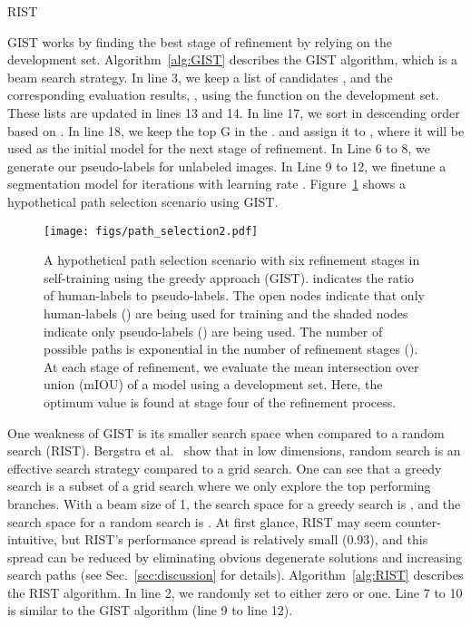 \documentclass[10pt, conference, compsocconf]{IEEEtran}
\begin{document}
\begin{algorithm}[h]
   \caption{RIST}
         \label{alg:RIST}
    \begin{algorithmic}[1]
    \scriptsize
    \FOR{ }
\STATE 
\STATE 
\STATE 
        \ENDFOR

            \STATE 
            \STATE 
        \ENDFOR
    \ENDFOR
\end{algorithmic}
\end{algorithm}


GIST works by finding the best stage of refinement by relying on the development set.
Algorithm~\ref{alg:GIST} describes the GIST algorithm, which is a beam search strategy. In line 3, we keep a list of candidates , and the corresponding evaluation results, , using the  function on the development set. These lists are updated in lines 13 and 14. In line 17, we sort  in descending order based on . In line 18, we keep the top G  in the . and assign it to , where it will be used as the initial model for the next stage of refinement.
In Line 6 to 8, we generate our pseudo-labels for  unlabeled images. In Line 9 to 12, we finetune a segmentation model for  iterations with learning rate . Figure~\ref{fig:sel} shows a hypothetical  path selection scenario using GIST.


\begin{figure}[htb]
  \centering
  \texttt{[image: figs/path\_selection2.pdf]}
  \caption{A hypothetical  path selection scenario with six refinement stages in self-training using the greedy approach (GIST).  indicates the ratio of human-labels to pseudo-labels. The open nodes indicate that only human-labels () are being used for training and the shaded nodes indicate only pseudo-labels () are being used. The number of possible paths is exponential in the number of refinement stages ().
  At each stage of refinement, we evaluate the mean intersection over union (mIOU) of a model using a development set. Here, the optimum value is found at stage four of the refinement process.
  }
  \label{fig:sel}
\end{figure}



One weakness of GIST is its smaller search space when compared to a random search (RIST). Bergstra et al.~\cite{bergstra2012random} show that in low dimensions, random search is an effective search strategy compared to a grid search. One can see that a greedy search is a subset of a grid search where we only explore the top performing branches. With a beam size of 1, the search space for a greedy search is , and the search space for a random search is . At first glance, RIST may seem counter-intuitive, but RIST's performance spread is relatively small (0.93), and this spread can be reduced by eliminating obvious degenerate solutions and increasing search paths (see Sec.~\ref{sec:discussion} for details).
Algorithm~\ref{alg:RIST} describes the RIST algorithm.  In line 2, we randomly set  to either zero or one.  Line 7 to 10 is similar to the GIST algorithm (line 9 to line 12).
\end{document}
